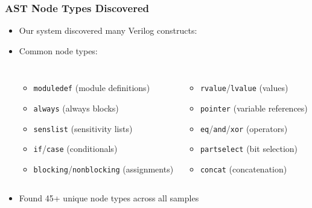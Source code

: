 \documentclass[aspectratio=169]{beamer}
\begin{document}
\begin{frame}
\frametitle{AST Node Types Discovered}
\begin{itemize}
    \item Our system discovered many Verilog constructs:
    \item Common node types:
    \begin{columns}
        \begin{itemize}
            \item \texttt{moduledef} (module definitions)
            \item \texttt{always} (always blocks)
            \item \texttt{senslist} (sensitivity lists)
            \item \texttt{if}/\texttt{case} (conditionals)
            \item \texttt{blocking}/\texttt{nonblocking} (assignments)
        \end{itemize}
        
        \begin{itemize}
            \item \texttt{rvalue}/\texttt{lvalue} (values)
            \item \texttt{pointer} (variable references)
            \item \texttt{eq}/\texttt{and}/\texttt{xor} (operators)
            \item \texttt{partselect} (bit selection)
            \item \texttt{concat} (concatenation)
        \end{itemize}
    \end{columns}
    \item Found 45+ unique node types across all samples
\end{itemize}
\end{frame}
\end{document}
